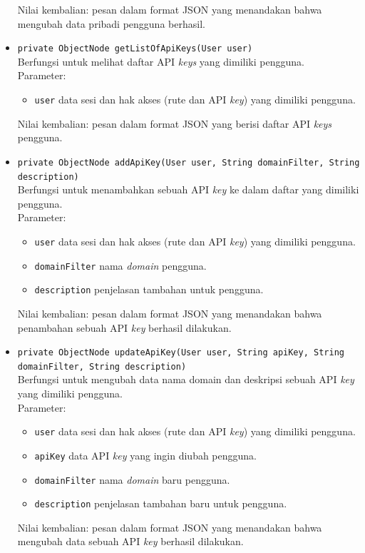 \begin{itemize}
	Nilai kembalian: pesan dalam format JSON yang menandakan bahwa mengubah data pribadi pengguna berhasil.
	\item \texttt{private ObjectNode getListOfApiKeys(User user)}\\
	Berfungsi untuk melihat daftar API \textit{keys} yang dimiliki pengguna.\\
	Parameter:
	\begin{itemize}
		\item \texttt{user} data sesi dan hak akses (rute dan API \textit{key}) yang dimiliki pengguna.
	\end{itemize}
	Nilai kembalian: pesan dalam format JSON yang berisi daftar API \textit{keys} pengguna.
	\item \texttt{private ObjectNode addApiKey(User user, String domainFilter, String description)}\\
	Berfungsi untuk menambahkan sebuah API \textit{key} ke dalam daftar yang dimiliki pengguna.\\
	Parameter:
	\begin{itemize}
		\item \texttt{user} data sesi dan hak akses (rute dan API \textit{key}) yang dimiliki pengguna.
		\item \texttt{domainFilter} nama \textit{domain} pengguna.
		\item \texttt{description} penjelasan tambahan untuk pengguna.
	\end{itemize}
	Nilai kembalian: pesan dalam format JSON yang menandakan bahwa penambahan sebuah API \textit{key} berhasil dilakukan.
	\item \texttt{private ObjectNode updateApiKey(User user, String apiKey, String domainFilter, String description)}\\
	Berfungsi untuk mengubah data nama domain dan deskripsi sebuah API \textit{key} yang dimiliki pengguna.\\
	Parameter:
	\begin{itemize}
		\item \texttt{user} data sesi dan hak akses (rute dan API \textit{key}) yang dimiliki pengguna.
		\item \texttt{apiKey} data API \textit{key} yang ingin diubah pengguna.
		\item \texttt{domainFilter} nama \textit{domain} baru pengguna.
		\item \texttt{description} penjelasan tambahan baru untuk pengguna.
	\end{itemize}
	Nilai kembalian: pesan dalam format JSON yang menandakan bahwa mengubah data sebuah API \textit{key} berhasil dilakukan.

\end{itemize}
